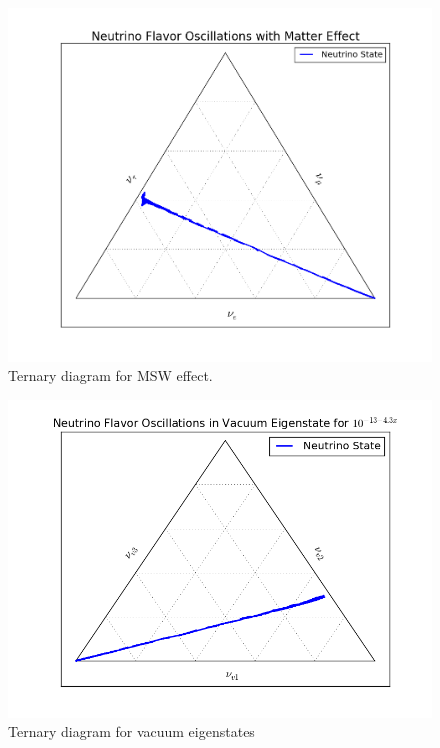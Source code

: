 \documentclass{tufte-handout}
\begin{document}
\begin{figure}
\centering
\includegraphics{assets/ternary/mass-1}
\caption{Ternary diagram for MSW effect.}
\label{fig:ternary-mass-1}
\end{figure}


\begin{figure}
\centering
\includegraphics{assets/ternary/matter-vac-eigen-e-1.png}
\caption{Ternary diagram for vacuum eigenstates}
\label{fig:matter-vac-eigen-e-1}
\end{figure}
\end{document}

